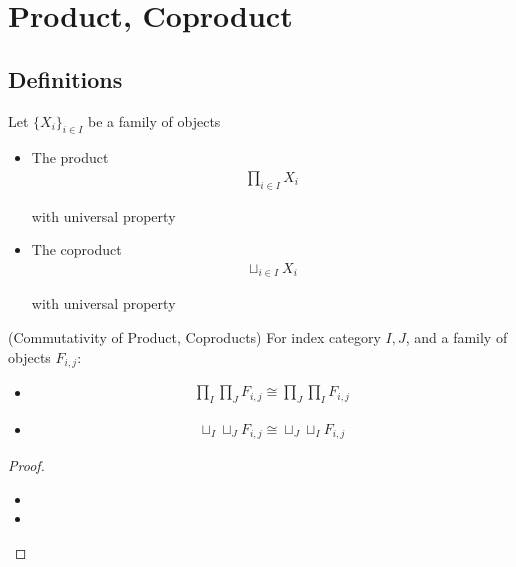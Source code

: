 \documentclass[Total.tex]{subfiles}
\begin{document}
			\section{Product, Coproduct}
			\subsection{Definitions}
				\begin{Def} Let $\{X_i\}_{i\in I}$ be a family of objects
					\begin{itemize}
						\item The product 
						\begin{gather*}
							\prod_{i\in I} X_i
						\end{gather*}
						
						with universal property
						\begin{center}
						\end{center}
						\item The coproduct
						\begin{gather*}
							\sqcup_{i\in I} X_i
						\end{gather*}
						
						with universal property
						\begin{center}
						\end{center}
					\end{itemize}
				\end{Def}
				
				
				\begin{proposition}
					(Commutativity of Product, Coproducts) For index category $I,J$, and a family of objects $F_{i,j}$:
					\begin{itemize}
						\item \begin{gather*}
							\prod_I\prod_J F_{i,j}\cong \prod_{J}\prod_I F_{i,j}
						\end{gather*}
						\item \begin{gather*}
							\sqcup_I\sqcup_J F_{i,j}\cong \sqcup_J\sqcup_I F_{i,j}
						\end{gather*}
					\end{itemize}
				\end{proposition}
				\begin{proof}
					\begin{itemize}
						\item 
						\item 
					\end{itemize}
				\end{proof}
				
\end{document}
